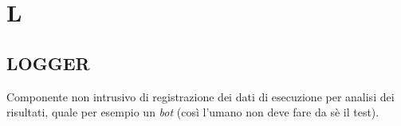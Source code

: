\newpage
	\section{L} \label{sec:L}
	
		\subsection{LOGGER}		\label{logger}
		Componente non intrusivo di registrazione dei dati di esecuzione per analisi dei risultati, quale per esempio un \textit{bot} (così l'umano non deve fare da sè il test).
	
	

